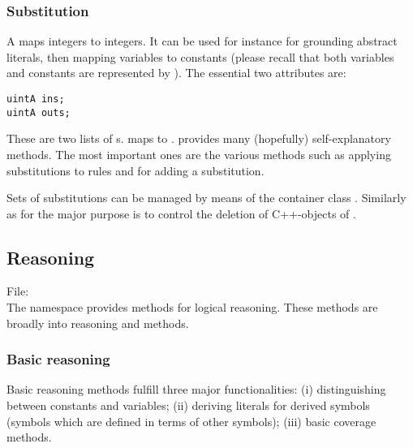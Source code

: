 \documentclass[10pt,twoside,twocolumn,fleqn]{article}
\begin{document}
\subsubsection{Substitution}

A  maps integers to integers. It can be used for
instance for grounding abstract literals, then mapping variables to
constants (please recall that both variables and constants are represented
by ). The essential two attributes are:
\begin{lstlisting}
uintA ins;
uintA outs;
\end{lstlisting}
These are two lists of s.  maps to .
 provides many (hopefully) self-explanatory methods.
The most important ones are the various  methods such as
applying substitutions to rules and  for adding a substitution.

Sets of substitutions can be managed by means of the container class
. Similarly as for  the major purpose
is to control the deletion of C++-objects of .

  





\subsection{Reasoning}

File: \\

The namespace  provides methods for logical reasoning. These
methods are broadly into  reasoning and 
methods.


\subsubsection{Basic reasoning}

Basic reasoning methods fulfill three major functionalities: (i)
distinguishing between constants and variables; (ii) deriving literals for
derived symbols (symbols which are defined in terms of other symbols);
(iii) basic coverage methods.
\end{document}
